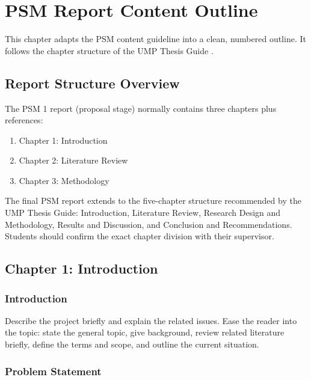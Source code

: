 \chapter{PSM Report Content Outline}

This chapter adapts the PSM content guideline \citep{psmguideline} into a clean, numbered outline. It follows the chapter structure of the UMP Thesis Guide \citep{umpthesis2019}.

\section{Report Structure Overview}

The PSM 1 report (proposal stage) normally contains three chapters plus references:

\begin{enumerate}
    \item Chapter 1: Introduction
    \item Chapter 2: Literature Review
    \item Chapter 3: Methodology
\end{enumerate}

The final PSM report extends to the five-chapter structure recommended by the UMP Thesis Guide: Introduction, Literature Review, Research Design and Methodology, Results and Discussion, and Conclusion and Recommendations. Students should confirm the exact chapter division with their supervisor.

\section{Chapter 1: Introduction}

\subsection{Introduction}

Describe the project briefly and explain the related issues. Ease the reader into the topic: state the general topic, give background, review related literature briefly, define the terms and scope, and outline the current situation.

\subsection{Problem Statement}


